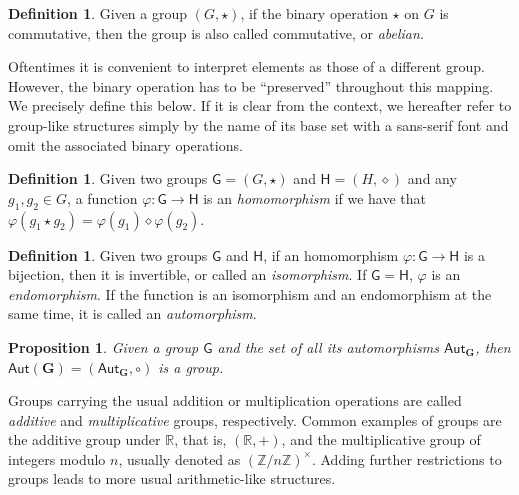 \documentclass[draft, 12pt, a4paper, oneside]{memoir}
\newtheorem{proposition}[theorem]{Proposition}
\theoremstyle{definition}
\newtheorem{definition}[theorem]{Definition}
\begin{document}
\begin{definition}
  Given a group $(G, \star)$, if the binary operation $\star$ on $G$ is commutative, then the group is also called commutative, or \emph{abelian}.
\end{definition}

Oftentimes it is convenient to interpret elements as those of a different group. However, the binary operation has to be ``preserved'' throughout this mapping. We precisely define this below. If it is clear from the context, we hereafter refer to group-like structures simply by the name of its base set with a sans-serif font and omit the associated binary operations. 

\begin{definition}
  Given two groups $\mathsf{G} = (G, \star)$ and $\mathsf{H} = (H, \diamond)$ and any $g_{1}, g_{2} \in G$, a function $\varphi : \mathsf{G} \to \mathsf{H}$ is an \emph{homomorphism} if we have that $\varphi(g_{1} \star g_{2}) = \varphi(g_{1}) \diamond \varphi(g_{2})$.
\end{definition}

\begin{definition}\label{def:morph}
  Given two groups $\mathsf{G}$ and $\mathsf{H}$, if an homomorphism $\varphi : \mathsf{G} \to \mathsf{H}$ is a bijection, then it is invertible, or called an \emph{isomorphism}. If $\mathsf{G} = \mathsf{H}$, $\varphi$ is an \emph{endomorphism}. If the function is an isomorphism and an endomorphism at the same time, it is called an \emph{automorphism}.
\end{definition}

\begin{proposition}\label{prop:autgroup}
  Given a group $\mathsf{G}$ and the set of all its automorphisms $\mathsf{Aut}_{\mathbf{G}}$, then $\mathsf{Aut}(\mathbf{G}) = (\mathsf{Aut}_{\mathbf{G}}, \circ)$ is a group.
\end{proposition}

Groups carrying the usual addition or multiplication operations are called \emph{additive} and \emph{multiplicative} groups, respectively. Common examples of groups are the additive group under $\mathbb{R}$, that is, $(\mathbb{R}, +)$, and the multiplicative group of integers modulo $n$, usually denoted as $(\mathbb{Z}/n\mathbb{Z})^{\times}$. Adding further restrictions to groups leads to more usual arithmetic-like structures.
\end{document}

